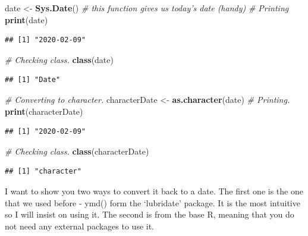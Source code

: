 \documentclass[]{book}
\newenvironment{Shaded}{\begin{snugshade}}{\end{snugshade}}
\newcommand{\CommentTok}[1]{\textcolor[rgb]{0.56,0.35,0.01}{\textit{#1}}}
\newcommand{\KeywordTok}[1]{\textcolor[rgb]{0.13,0.29,0.53}{\textbf{#1}}}
\newcommand{\NormalTok}[1]{#1}
\newcommand{\StringTok}[1]{\textcolor[rgb]{0.31,0.60,0.02}{#1}}
\begin{document}
\begin{Shaded}
\begin{Highlighting}[]
\NormalTok{date <-}\StringTok{ }\KeywordTok{Sys.Date}\NormalTok{() }\CommentTok{# this function gives us today's date (handy)}
\CommentTok{# Printing}
\KeywordTok{print}\NormalTok{(date)}
\end{Highlighting}
\end{Shaded}

\begin{verbatim}
## [1] "2020-02-09"
\end{verbatim}

\begin{Shaded}
\begin{Highlighting}[]
\CommentTok{# Checking class.}
\KeywordTok{class}\NormalTok{(date)}
\end{Highlighting}
\end{Shaded}

\begin{verbatim}
## [1] "Date"
\end{verbatim}

\begin{Shaded}
\begin{Highlighting}[]
\CommentTok{# Converting to character.}
\NormalTok{characterDate <-}\StringTok{ }\KeywordTok{as.character}\NormalTok{(date)}
\CommentTok{# Printing.}
\KeywordTok{print}\NormalTok{(characterDate)}
\end{Highlighting}
\end{Shaded}

\begin{verbatim}
## [1] "2020-02-09"
\end{verbatim}

\begin{Shaded}
\begin{Highlighting}[]
\CommentTok{# Checking class.}
\KeywordTok{class}\NormalTok{(characterDate)}
\end{Highlighting}
\end{Shaded}

\begin{verbatim}
## [1] "character"
\end{verbatim}

I want to show you two ways to convert it back to a date. The first one is the one that we used before - ymd() form the `lubridate' package. It is the most intuitive so I will insist on using it. The second is from the base R, meaning that you do not need any external packages to use it.
\end{document}
